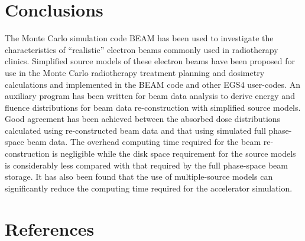 \documentclass[12pt,twoside]{article}
\begin{document}
\section{Conclusions}
The Monte Carlo simulation code BEAM has been used to investigate the
characteristics of ``realistic'' electron beams commonly used in
radiotherapy clinics. Simplified source models of these electron beams
have been proposed for use in the Monte Carlo radiotherapy treatment
planning and dosimetry calculations and implemented in the BEAM code and
other EGS4 user-codes. An auxiliary program has been written for beam data
analysis to derive energy and fluence distributions for  beam data
re-construction with simplified source models. Good agreement has been
achieved between the absorbed dose distributions calculated using
re-constructed beam data and that using simulated full phase-space beam
data. The overhead computing time required for the beam re-construction is
negligible while the disk space requirement for the source models is
considerably less compared with that required by the full  phase-space
beam storage.
It has also been found that the use of multiple-source models can
significantly reduce the computing time required for the accelerator
simulation\cite{Ma96}.



\section{References}
\renewcommand{\rightmark}{References}
\setlength{\baselineskip}{0.5cm}
\vspace*{-1cm}


\end{document}
